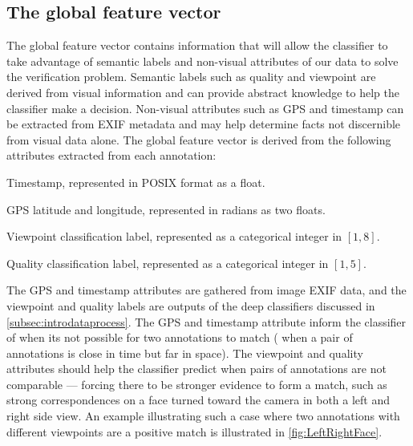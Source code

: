 \subsection{The global feature vector}

The global feature vector contains information that will allow the classifier to take advantage of semantic
  labels and non-visual attributes of our data to solve the verification problem.
Semantic labels such as quality and viewpoint are derived from visual information and can provide abstract
  knowledge to help the classifier make a decision.
Non-visual attributes such as GPS and timestamp can be extracted from EXIF metadata and may help determine facts
  not discernible from visual data alone.
The global feature vector is derived from the following attributes extracted from each annotation:
\begin{enumln}

    \item Timestamp, represented in POSIX format as a float.

    \item GPS latitude and longitude, represented in radians as two floats. 

    \item Viewpoint classification label, represented as a categorical integer in $[1,8]$.

    \item Quality classification label, represented as a categorical integer in $[1,5]$.
\end{enumln}
The GPS and timestamp attributes are gathered from image EXIF data, and the viewpoint and quality labels are
  outputs of the deep classifiers discussed in \cref{subsec:introdataprocess}.
The GPS and timestamp attribute inform the classifier of when its not possible for two annotations to match
  (\eg{} when a pair of annotations is close in time but far in space).
The viewpoint and quality attributes should help the classifier predict when pairs of annotations are not
  comparable --- forcing there to be stronger evidence to form a match, such as strong correspondences on a face
  turned toward the camera in both a left and right side view.
An example illustrating such a case where two annotations with different viewpoints are a positive match is
  illustrated in \cref{fig:LeftRightFace}.

\LeftRightFace{}



